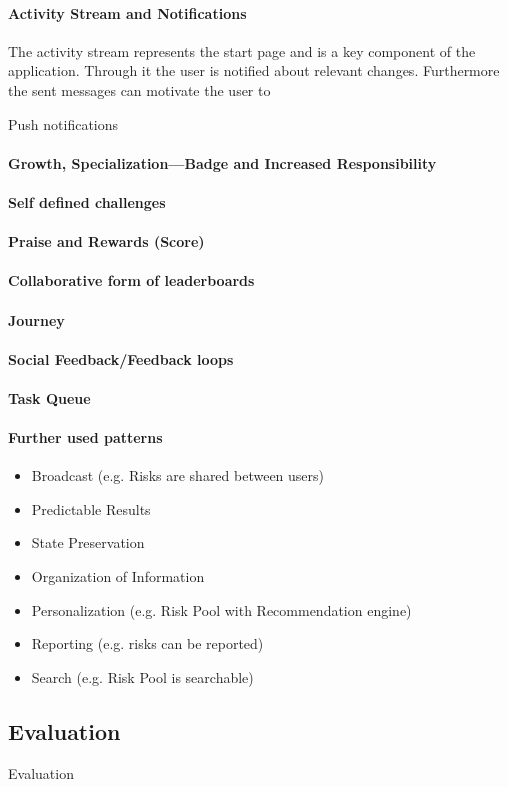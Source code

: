 \paragraph*{Activity Stream and Notifications}
The activity stream represents the start page and is a key component of the application. Through it the user is notified about relevant changes. Furthermore the sent messages can motivate the user to 

Push notifications

\paragraph*{Growth, Specialization—Badge and Increased Responsibility}

\paragraph*{Self defined challenges}

\paragraph*{Praise and Rewards (Score)}

\paragraph*{Collaborative form of leaderboards}

\paragraph*{Journey}

\paragraph*{Social Feedback/Feedback loops}

\paragraph*{Task Queue}

\paragraph*{Further used patterns}

\begin{itemize}
	\item Broadcast (e.g. Risks are shared between users)
	\item Predictable Results
	\item State Preservation
	\item Organization of Information
	\item Personalization (e.g. Risk Pool with Recommendation engine)
	\item Reporting (e.g. risks can be reported)
	\item Search (e.g. Risk Pool is searchable)
\end{itemize}


\subsection{Evaluation}
\label{sec:domainCd}
Evaluation
